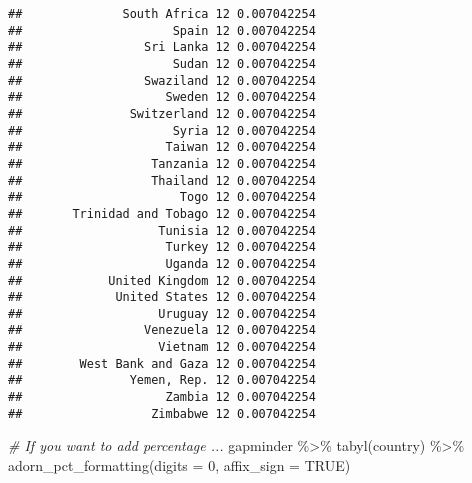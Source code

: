 \documentclass[
]{book}
\newenvironment{Shaded}{\begin{snugshade}}{\end{snugshade}}
\newcommand{\AttributeTok}[1]{\textcolor[rgb]{0.77,0.63,0.00}{#1}}
\newcommand{\CommentTok}[1]{\textcolor[rgb]{0.56,0.35,0.01}{\textit{#1}}}
\newcommand{\ConstantTok}[1]{\textcolor[rgb]{0.00,0.00,0.00}{#1}}
\newcommand{\DecValTok}[1]{\textcolor[rgb]{0.00,0.00,0.81}{#1}}
\newcommand{\FunctionTok}[1]{\textcolor[rgb]{0.00,0.00,0.00}{#1}}
\newcommand{\NormalTok}[1]{#1}
\newcommand{\SpecialCharTok}[1]{\textcolor[rgb]{0.00,0.00,0.00}{#1}}
\begin{document}
\begin{verbatim}
##              South Africa 12 0.007042254
##                     Spain 12 0.007042254
##                 Sri Lanka 12 0.007042254
##                     Sudan 12 0.007042254
##                 Swaziland 12 0.007042254
##                    Sweden 12 0.007042254
##               Switzerland 12 0.007042254
##                     Syria 12 0.007042254
##                    Taiwan 12 0.007042254
##                  Tanzania 12 0.007042254
##                  Thailand 12 0.007042254
##                      Togo 12 0.007042254
##       Trinidad and Tobago 12 0.007042254
##                   Tunisia 12 0.007042254
##                    Turkey 12 0.007042254
##                    Uganda 12 0.007042254
##            United Kingdom 12 0.007042254
##             United States 12 0.007042254
##                   Uruguay 12 0.007042254
##                 Venezuela 12 0.007042254
##                   Vietnam 12 0.007042254
##        West Bank and Gaza 12 0.007042254
##               Yemen, Rep. 12 0.007042254
##                    Zambia 12 0.007042254
##                  Zimbabwe 12 0.007042254
\end{verbatim}

\begin{Shaded}
\begin{Highlighting}[]
\CommentTok{\# If you want to add percentage ... }
\NormalTok{gapminder }\SpecialCharTok{\%\textgreater{}\%}
  \FunctionTok{tabyl}\NormalTok{(country) }\SpecialCharTok{\%\textgreater{}\%}
  \FunctionTok{adorn\_pct\_formatting}\NormalTok{(}\AttributeTok{digits =} \DecValTok{0}\NormalTok{, }\AttributeTok{affix\_sign =} \ConstantTok{TRUE}\NormalTok{)}
\end{Highlighting}
\end{Shaded}
\end{document}
